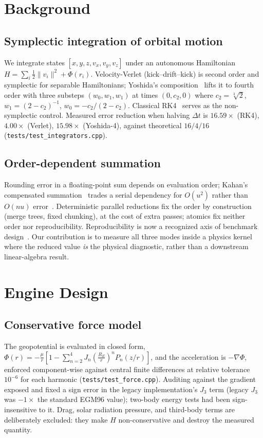 \documentclass[conference]{IEEEtran}
\begin{document}
\section{Background}
\label{sec:background}

\subsection{Symplectic integration of orbital motion}
We integrate states $[x,y,z,v_x,v_y,v_z]$ under an autonomous
Hamiltonian $H=\sum_i \tfrac12 \|v_i\|^2 + \Phi(r_i)$. Velocity-Verlet
(kick--drift--kick) is second order and symplectic for separable
Hamiltonians; Yoshida's composition~\cite{yoshida1990} lifts it to fourth
order with three substeps $(w_0,w_1,w_1)$ at times $(0,c_2,0)$ where
$c_2=\sqrt[3]{2}$, $w_1=(2-c_2)^{-1}$, $w_0=-c_2/(2-c_2)$. Classical
RK4~\cite{hairer2006} serves as the non-symplectic control. Measured error
reduction when halving $\Delta t$ is $16.59\times$ (RK4), $4.00\times$
(Verlet), $15.98\times$ (Yoshida-4), against theoretical $16/4/16$
(\texttt{tests/test\_integrators.cpp}).

\subsection{Order-dependent summation}
Rounding error in a floating-point sum depends on evaluation order; Kahan's
compensated summation~\cite{kahan1965} trades a serial dependency for
$O(u^2)$ rather than $O(nu)$ error~\cite{higham2002}. Deterministic parallel
reductions fix the order by construction (merge trees, fixed chunking), at
the cost of extra passes; atomics fix neither order nor reproducibility.
Reproducibility is now a recognized axis of benchmark
design~\cite{hoefler2015}. Our contribution is to measure all three modes
inside a physics kernel where the reduced value \emph{is} the physical
diagnostic, rather than a downstream linear-algebra result.

\section{Engine Design}
\label{sec:design}

\subsection{Conservative force model}
The geopotential is evaluated in closed form,
$\Phi(r)=-\frac{\mu}{r}\left[1-\sum_{n=2}^{4}J_n
\left(\frac{R_E}{r}\right)^n P_n(z/r)\right]$, and the acceleration is
$-\nabla\Phi$, enforced component-wise against central finite differences
at relative tolerance $10^{-6}$ for each harmonic
(\texttt{tests/test\_force.cpp}). Auditing against the gradient exposed and
fixed a sign error in the legacy implementation's $J_3$ term (legacy $J_3$
was $-1\times$ the standard EGM96 value); two-body energy tests had been
sign-insensitive to it. Drag, solar radiation pressure, and third-body
terms are deliberately excluded: they make $H$ non-conservative and
destroy the measured quantity.
\end{document}

